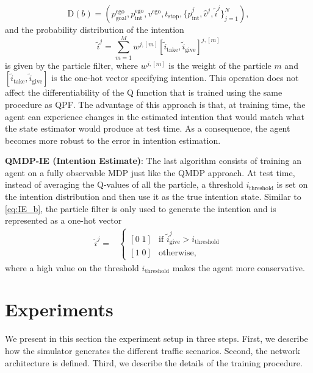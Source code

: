 \begin{equation}
    \text{D}(b) = (p^\mathrm{ego}_\mathrm{goal},p^\mathrm{ego}_\mathrm{int}, v^\mathrm{ego}, t_\mathrm{stop}, \{\hat{p}^{j}_\mathrm{int}, \hat{v}^j, \tilde{i}^j\}_{j=1}^N),
    \label{eq:IE_b}
\end{equation}
and the probability distribution of the intention
\begin{equation}
    \tilde{i}^j = \sum_{m=1}^M w^{j,[m]} [\tilde{i}_\text{take} , \tilde{i}_\text{give}]^{j,[m]}
\end{equation}
is given by the particle filter, where $w^{j,[m]}$ is the weight of the particle $m$ and $[\tilde{i}_\text{take} , \tilde{i}_\text{give}]$ is the one-hot vector specifying intention. 
This operation does not affect the differentiability of the Q function that is trained using the same procedure as QPF. 
The advantage of this approach is that, at training time, the agent can experience changes in the estimated intention that would match what the state estimator would produce at test time.
As a consequence, the agent becomes more robust to the error in intention estimation.


\textbf{QMDP-IE (Intention Estimate)}: The last algorithm consists of training an agent on a fully observable MDP just like the QMDP approach. At test time, instead of averaging the Q-values of all the particle, a threshold $i_\text{threshold}$ is set on the intention distribution and then use it as the true intention state. 
Similar to \ref{eq:IE_b}, the particle filter is only used to generate the intention and is represented as a one-hot vector
\begin{align}
\hat{i}^j = & \begin{cases}
[0 \; 1] & \text{if } \tilde{i}^j_\text{give} > i_\text{threshold}\\
[1 \; 0] & \text{otherwise,}
\label{eq:IE_i}
\end{cases} 
\end{align}
where a high value on the threshold $i_\text{threshold}$ makes the agent more conservative. 


\section{Experiments}
\label{sec:experiments}
We present in this section the experiment setup in three steps. First, we describe how the simulator generates the different traffic scenarios. Second, the network architecture is defined. Third, we describe the details of the training procedure. 

